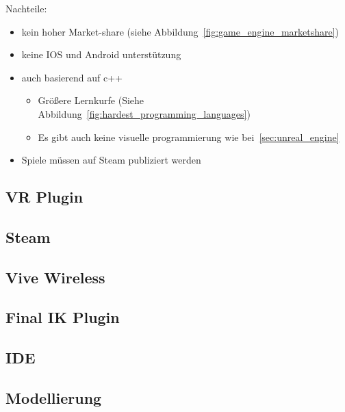 Nachteile:

\begin{itemize}
    \item kein hoher Market-share (siehe Abbildung~\ref{fig:game_engine_marketshare})
    \item keine IOS und Android unterstützung
    \item auch basierend auf c++
    \begin{itemize}
        \item Größere Lernkurfe (Siehe Abbildung~\ref{fig:hardest_programming_languages}\cite{JAXCENTER_2018})
        \item Es gibt auch keine visuelle programmierung wie bei~\ref{sec:unreal_engine}
    \end{itemize}
    \item Spiele müssen auf Steam publiziert werden
\end{itemize}



\subsection{VR Plugin}

\subsection{Steam}

\subsection{Vive Wireless}

\subsection{Final IK Plugin}

\subsection{IDE}

\subsection{Modellierung}
